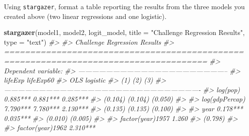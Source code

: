 \documentclass[]{book}
\newenvironment{Shaded}{\begin{snugshade}}{\end{snugshade}}
\newcommand{\CommentTok}[1]{\textcolor[rgb]{0.56,0.35,0.01}{\textit{#1}}}
\newcommand{\DataTypeTok}[1]{\textcolor[rgb]{0.13,0.29,0.53}{#1}}
\newcommand{\KeywordTok}[1]{\textcolor[rgb]{0.13,0.29,0.53}{\textbf{#1}}}
\newcommand{\NormalTok}[1]{#1}
\newcommand{\StringTok}[1]{\textcolor[rgb]{0.31,0.60,0.02}{#1}}
\begin{document}
Using \texttt{stargazer}, format a table reporting the results from the three models you created above (two linear regressions and one logistic).

\begin{Shaded}
\begin{Highlighting}[]
\KeywordTok{stargazer}\NormalTok{(model1, model2, logit_model, }\DataTypeTok{title =} \StringTok{"Challenge Regression Results"}\NormalTok{, }\DataTypeTok{type =} \StringTok{"text"}\NormalTok{)}
\CommentTok{#> }
\CommentTok{#> Challenge Regression Results}
\CommentTok{#> =====================================================================================}
\CommentTok{#>                                            Dependent variable:                       }
\CommentTok{#>                     -----------------------------------------------------------------}
\CommentTok{#>                                            lifeExp                         lifeExp60 }
\CommentTok{#>                                              OLS                            logistic }
\CommentTok{#>                                 (1)                        (2)                (3)    }
\CommentTok{#> -------------------------------------------------------------------------------------}
\CommentTok{#> log(pop)                     0.885***                    0.881***           0.285*** }
\CommentTok{#>                               (0.104)                    (0.104)            (0.050)  }
\CommentTok{#>                                                                                      }
\CommentTok{#> log(gdpPercap)               7.790***                    7.780***           2.130*** }
\CommentTok{#>                               (0.135)                    (0.135)            (0.100)  }
\CommentTok{#>                                                                                      }
\CommentTok{#> year                         0.178***                                       0.035*** }
\CommentTok{#>                               (0.010)                                       (0.005)  }
\CommentTok{#>                                                                                      }
\CommentTok{#> factor(year)1957                                          1.260                      }
\CommentTok{#>                                                          (0.798)                     }
\CommentTok{#>                                                                                      }
\CommentTok{#> factor(year)1962                                         2.310***                    }

\end{Highlighting}
\end{Shaded}
\end{document}
